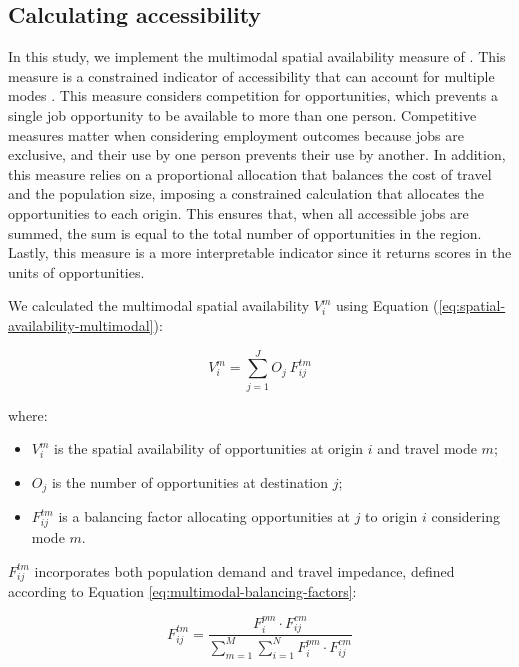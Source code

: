 \documentclass[preprint, 3p,
authoryear]{elsarticle} %
\providecommand{\tightlist}{%
  \setlength{\itemsep}{0pt}\setlength{\parskip}{0pt}}
\begin{document}
\subsection{Calculating accessibility}\label{calculating-accessibility}

In this study, we implement the multimodal spatial availability measure
of \citet{soukhov2024}. This measure is a constrained indicator of
accessibility that can account for multiple modes
\citep[see][]{soukhov2023, soukhov2025}. This measure considers
competition for opportunities, which prevents a single job opportunity
to be available to more than one person. Competitive measures matter
when considering employment outcomes because jobs are exclusive, and
their use by one person prevents their use by another. In addition, this
measure relies on a proportional allocation that balances the cost of
travel and the population size, imposing a constrained calculation that
allocates the opportunities to each origin. This ensures that, when all
accessible jobs are summed, the sum is equal to the total number of
opportunities in the region. Lastly, this measure is a more
interpretable indicator since it returns scores in the units of
opportunities.

We calculated the multimodal spatial availability \(V_i^m\) using
Equation (\ref{eq:spatial-availability-multimodal}):

\begin{equation}
\label{eq:spatial-availability-multimodal}
V^m_{i} = \sum_{j=1}^J O_j\ F^{tm}_{ij}
\end{equation}

where:

\begin{itemize}
\tightlist
\item
  \(V^m_{i}\) is the spatial availability of opportunities at origin
  \(i\) and travel mode \(m\);
\item
  \(O_j\) is the number of opportunities at destination \(j\);
\item
  \(F^{tm}_{ij}\) is a balancing factor allocating opportunities at
  \(j\) to origin \(i\) considering mode \(m\).
\end{itemize}

\(F^{tm}_{ij}\) incorporates both population demand and travel
impedance, defined according to Equation
\ref{eq:multimodal-balancing-factors}:

\begin{equation}
\label{eq:multimodal-balancing-factors}
F^{tm}_{ij} = \frac{F^{pm}_{i} \cdot F^{cm}_{ij}}{\sum_{m=1}^M \sum_{i=1}^N F^{pm}_{i} \cdot F^{cm}_{ij}}
\end{equation}
\end{document}
